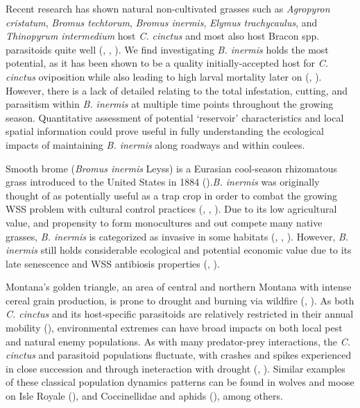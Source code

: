 \documentclass[
]{article}
\begin{document}
Recent research has shown natural non-cultivated grasses such as
\emph{Agropyron cristatum}, \emph{Bromus techtorum}, \emph{Bromus
inermis}, \emph{Elymus trachycaulus}, and \emph{Thinopyrum intermedium}
host \emph{C. cinctus} and most also host Bracon spp. parasitoids quite
well (,
,
). We find investigating
\emph{B. inermis} holds the most potential, as it has been shown to be a
quality initially-accepted host for \emph{C. cinctus} oviposition while
also leading to high larval mortality later on
(,
). However, there
is a lack of detailed relating to the total infestation, cutting, and
parasitism within \emph{B. inermis} at multiple time points throughout
the growing season. Quantitative assessment of potential `reservoir'
characteristics and local spatial information could prove useful in
fully understanding the ecological impacts of maintaining \emph{B.
inermis} along roadways and within coulees.

Smooth brome (\emph{Bromus inermis} Leyss) is a Eurasian cool-season
rhizomatous grass introduced to the United States in 1884
().\emph{B.
inermis} was originally thought of as potentially useful as a trap crop
in order to combat the growing WSS problem with cultural control
practices (,
,
). Due to its low
agricultural value, and propensity to form monocultures and out compete
many native grasses, \emph{B. inermis} is categorized as invasive in
some habitats (,
,
). However, \emph{B.
inermis} still holds considerable ecological and potential economic
value due to its late senescence and WSS antibiosis properties
(,
).

Montana's golden triangle, an area of central and northern Montana with
intense cereal grain production, is prone to drought and burning via
wildfire (,
). As both \emph{C.
cinctus} and its host-specific parasitoids are relatively restricted in
their annual mobility (),
environmental extremes can have broad impacts on both local pest and
natural enemy populations. As with many predator-prey interactions, the
\emph{C. cinctus} and parasitoid populations fluctuate, with crashes and
spikes experienced in close succession and through ineteraction with
drought (,
). Similar examples of these
classical population dynamics patterns can be found in wolves and moose
on Isle Royale (), and
Coccinellidae and aphids (), among
others.
\end{document}
